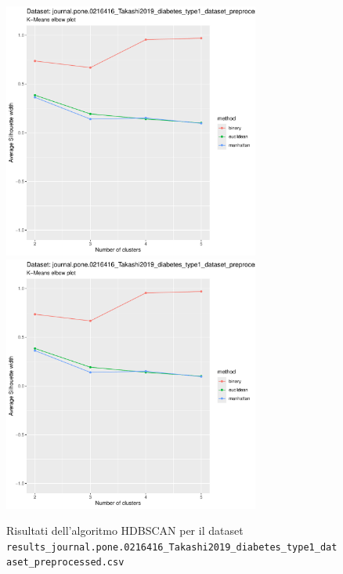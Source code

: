 \documentclass[12pt]{report}
\begin{document}
			\begin{figure}[h]
				\centering
				\includegraphics[width = 0.75\textwidth, height = 0.45\textheight, page = 7]{
					results/results_journal.pone.0216416_Takashi2019_diabetes_type1_dataset_preprocessed.csv.pdf
				}
				\includegraphics[width = 0.75\textwidth, height = 0.45\textheight, page = 8]{
					results/results_journal.pone.0216416_Takashi2019_diabetes_type1_dataset_preprocessed.csv.pdf
				}
				\caption{Risultati dell'algoritmo HDBSCAN per il dataset
				\texttt{results\_journal.pone.0216416\_Takashi2019\_diabetes\_type1\_dataset\_preprocessed.csv}}
				\label{fig:hdbscan4}
			\end{figure}
\end{document}
